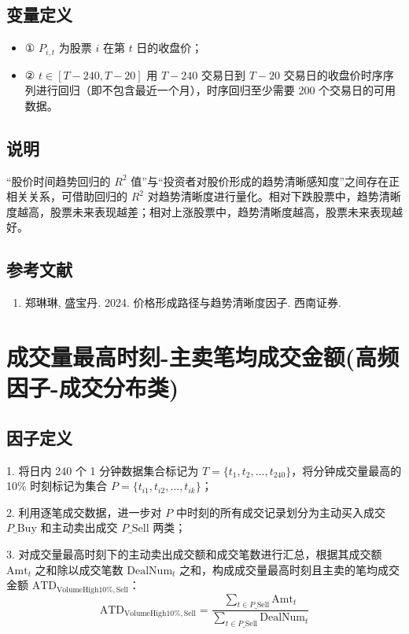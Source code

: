 \documentclass{article}
\begin{document}
\subsection{变量定义}
\begin{itemize}
    \item ① \( P_{i,t} \) 为股票 \( i \) 在第 \( t \) 日的收盘价；
    \item ② \( t \in [T-240, T-20] \) 用 \( T-240 \) 交易日到 \( T-20 \) 交易日的收盘价时序序列进行回归（即不包含最近一个月），时序回归至少需要 200 个交易日的可用数据。
\end{itemize}

\subsection{说明}
“股价时间趋势回归的 \( R^2 \) 值”与“投资者对股价形成的趋势清晰感知度”之间存在正相关关系，可借助回归的 \( R^2 \) 对趋势清晰度进行量化。相对下跌股票中，趋势清晰度越高，股票未来表现越差；相对上涨股票中，趋势清晰度越高，股票未来表现越好。

\subsection{参考文献}
\begin{enumerate}
    \item 郑琳琳, 盛宝丹. 2024. 价格形成路径与趋势清晰度因子. 西南证券.
\end{enumerate}

\section{成交量最高时刻-主卖笔均成交金额(高频因子-成交分布类)}

\subsection{因子定义}

1. 将日内 240 个 1 分钟数据集合标记为 \( T = \{t_1, t_2, \dots, t_{240}\} \)，将分钟成交量最高的 10\% 时刻标记为集合 \( P = \{t_{i1}, t_{i2}, \dots, t_{ik}\} \)；

2. 利用逐笔成交数据，进一步对 \( P \) 中时刻的所有成交记录划分为主动买入成交 \( P\_\mathrm{Buy} \) 和主动卖出成交 \( P\_\mathrm{Sell} \) 两类；

3. 对成交量最高时刻下的主动卖出成交额和成交笔数进行汇总，根据其成交额 \( \mathrm{Amt}_t \) 之和除以成交笔数 \( \mathrm{DealNum}_t \) 之和，构成成交量最高时刻且主卖的笔均成交金额 \( \mathrm{ATD}_{\mathrm{VolumeHigh10\%,Sell}} \)：
\begin{equation}
    \mathrm{ATD}_{\mathrm{VolumeHigh10\%,Sell}} = \frac{\sum_{t \in P\_\mathrm{Sell}} \mathrm{Amt}_t}{\sum_{t \in P\_\mathrm{Sell}} \mathrm{DealNum}_t}
\end{equation}
\end{document}
